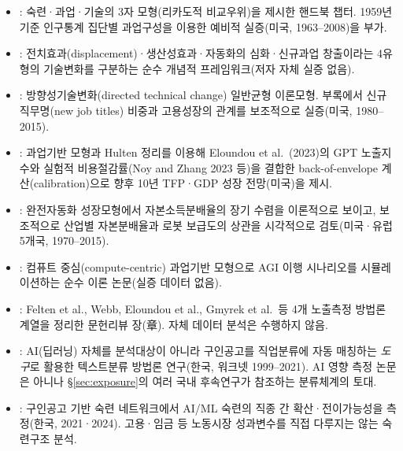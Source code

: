 \documentclass[11pt]{article}
\begin{document}
\begin{itemize}[leftmargin=*]
  \item \citet{acemoglu-2011-skills-tasks-and-technologies-implications}: 숙련·과업·기술의 3자 모형(리카도적 비교우위)을 제시한 핸드북 챕터. 1959년 기준 인구통계 집단별 과업구성을 이용한 예비적 실증(미국, 1963--2008)을 부가.
  \item \citet{acemoglu-2018-artificial-intelligence-automation-and}: 전치효과(displacement)·생산성효과·자동화의 심화·신규과업 창출이라는 4유형의 기술변화를 구분하는 순수 개념적 프레임워크(저자 자체 실증 없음).
  \item \citet{acemoglu-2018-the-race-between-man-and}: 방향성기술변화(directed technical change) 일반균형 이론모형. 부록에서 신규 직무명(new job titles) 비중과 고용성장의 관계를 보조적으로 실증(미국, 1980--2015).
  \item \citet{acemoglu-2024-the-simple-macroeconomics-of-ai}: 과업기반 모형과 Hulten 정리를 이용해 Eloundou et al.\ (2023)의 GPT 노출지수와 실험적 비용절감률(Noy and Zhang 2023 등)을 결합한 back-of-envelope 계산(calibration)으로 향후 10년 TFP·GDP 성장 전망(미국)을 제시.
  \item \citet{aghion-2017-artificial-intelligence-and-economic-growth}: 완전자동화 성장모형에서 자본소득분배율의 장기 수렴을 이론적으로 보이고, 보조적으로 산업별 자본분배율과 로봇 보급도의 상관을 시각적으로 검토(미국·유럽 5개국, 1970--2015).
  \item \citet{korinek-2024-scenarios-for-the-transition-to}: 컴퓨트 중심(compute-centric) 과업기반 모형으로 AGI 이행 시나리오를 시뮬레이션하는 순수 이론 논문(실증 데이터 없음).
  \item \citet{lee-2024-generative-ai-labor-market-measurement}: Felten et al., Webb, Eloundou et al., Gmyrek et al.\ 등 4개 노출측정 방법론 계열을 정리한 문헌리뷰 장(章). 자체 데이터 분석은 수행하지 않음.
  \item \citet{chang-2022-deep-learning-job-classification-system}: AI(딥러닝) 자체를 분석대상이 아니라 구인공고를 직업분류에 자동 매칭하는 \emph{도구}로 활용한 텍스트분류 방법론 연구(한국, 워크넷 1999--2021). AI 영향 측정 논문은 아니나 \S\ref{sec:exposure}의 여러 국내 후속연구가 참조하는 분류체계의 토대.
  \item \citet{chang-2026-skill-network-ai-era}: 구인공고 기반 숙련 네트워크에서 AI/ML 숙련의 직종 간 확산·전이가능성을 측정(한국, 2021·2024). 고용·임금 등 노동시장 성과변수를 직접 다루지는 않는 숙련구조 분석.
\end{itemize}

\end{document}
